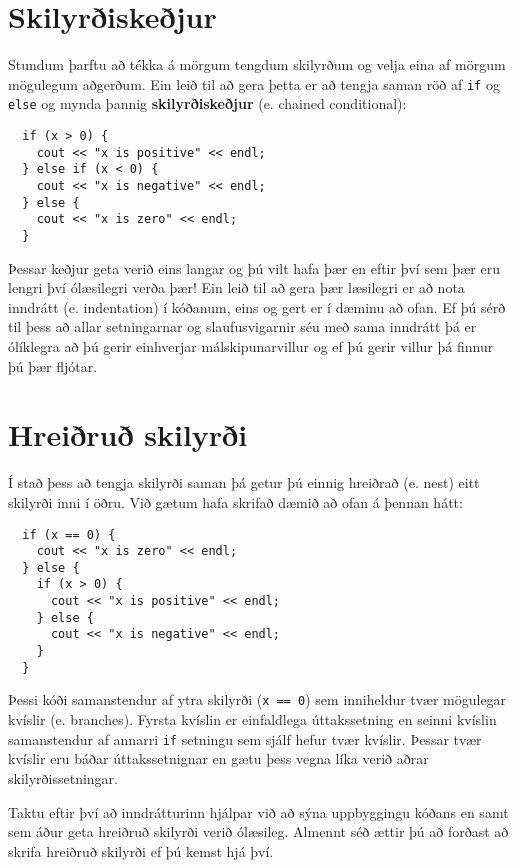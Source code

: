 \section {Skilyrðiskeðjur}

Stundum þarftu að tékka á mörgum tengdum skilyrðum og velja eina af mörgum mögulegum aðgerðum.
Ein leið til að gera þetta er að tengja saman röð af {\tt if} og {\tt else} og mynda þannig {\bf skilyrðiskeðjur} (e. chained conditional):

\begin{verbatim}
  if (x > 0) {
    cout << "x is positive" << endl;
  } else if (x < 0) {
    cout << "x is negative" << endl;
  } else {
    cout << "x is zero" << endl;
  }
\end{verbatim}
%
Þessar keðjur geta verið eins langar og þú vilt hafa þær en eftir því sem þær eru lengri því ólæsilegri verða þær!
Ein leið til að gera þær læsilegri er að nota inndrátt (e. indentation) í kóðanum, eins og gert er í dæminu að ofan.
Ef þú sérð til þess að allar setningarnar og slaufusvigarnir séu með sama inndrátt þá er ólíklegra að þú gerir einhverjar málskipunarvillur og ef þú gerir villur þá finnur þú þær fljótar.

\section{Hreiðruð skilyrði}

Í stað þess að tengja skilyrði saman þá getur þú einnig hreiðrað (e. nest) eitt skilyrði inni í öðru.
Við gætum hafa skrifað dæmið að ofan á þennan hátt:

\begin{verbatim}
  if (x == 0) {
    cout << "x is zero" << endl;
  } else {
    if (x > 0) {
      cout << "x is positive" << endl;
    } else {
      cout << "x is negative" << endl;
    }
  }
\end{verbatim}
%
Þessi kóði samanstendur af ytra skilyrði ({\tt x == 0}) sem inniheldur tvær mögulegar kvíslir (e. branches).
Fyrsta kvíslin er einfaldlega úttakssetning en seinni kvíslin samanstendur af annarri {\tt if} setningu sem sjálf hefur tvær kvíslir.
Þessar tvær kvíslir eru báðar úttakssetnignar en gætu þess vegna líka verið aðrar skilyrðissetningar.

Taktu eftir því að inndrátturinn hjálpar við að sýna uppbyggingu kóðans en samt sem áður geta hreiðruð skilyrði verið ólæsileg.
Almennt séð ættir þú að forðast að skrifa hreiðruð skilyrði ef þú kemst hjá því.

